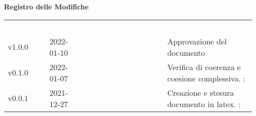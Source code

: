 

{\LARGE{\textbf{Registro delle Modifiche}}} \\
\begin{table}[!htbp]
\renewcommand{\arraystretch}{1.5}
\begin{tabular}{ m{}<{\centering}  m{}<{\centering}  m{}<{\centering}  m{}<{\centering}  m{}<{\centering} }
	\rowcolor{darkblue}
	\textcolor{white}{\textbf{Versione}} &\textcolor{white}{\textbf{Data}}& \textcolor{white}{\textbf{Nominativo}} & \textcolor{white}{\textbf{Ruolo}}&\textcolor{white}{\textbf{Descrizione}}\\ 

	v1.0.0 & 2022-01-10 & \GC & \RE & Approvazione del documento \\

	\rowcolor{gray!25}v0.1.0& 2022-01-07& \PV & \AN & Verifica di coerenza e coesione complessiva. \VE: \textit{\FP{}}\\

	v0.0.1& 2021-12-27& \PV &\AN & Creazione e stesura documento in latex. \VE: \textit{\FP{}}\\

\end{tabular}
\end{table}

\pagebreak